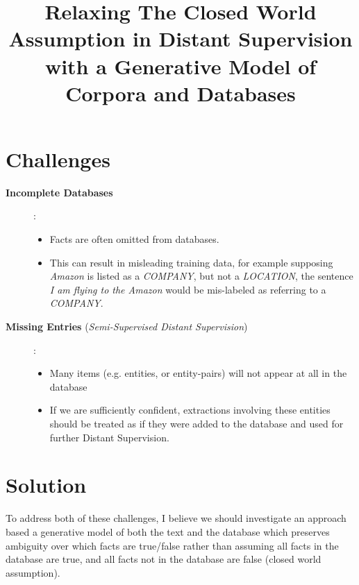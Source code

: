 \documentclass[12pt]{article}
\begin{document}
\date{}
\title{Relaxing The Closed World Assumption in Distant Supervision with a Generative Model of Corpora and Databases}
\author{}
\maketitle



\section{Challenges}
\begin{description}
  \item[{\bf Incomplete Databases}]:
    \begin{itemize}
    \item Facts are often omitted from databases.
    \item This can result in misleading training data, for example supposing \emph{Amazon} is listed as a {\sl COMPANY},
      but not a {\sl LOCATION}, the sentence \emph{I am flying to the Amazon} would be mis-labeled as referring
      to a {\sl COMPANY}.
    \end{itemize}
  \item[{\bf Missing Entries} (\emph{Semi-Supervised Distant Supervision})]:
    \begin{itemize}
      \item Many items (e.g. entities, or entity-pairs) will not appear at all in the database
      \item If we are sufficiently confident, extractions involving these entities should be treated as if they were added to the database
        and used for further Distant Supervision.
    \end{itemize}
\end{description}

\section{Solution}
To address both of these challenges, I believe we should investigate an approach based a generative model of both the text and the database which
preserves ambiguity over which facts are true/false rather than assuming all facts in the database are true, and all facts not in the database
are false (closed world assumption).
\end{document}
